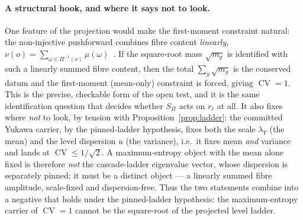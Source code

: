\documentclass[11pt]{article}
\theoremstyle{definition}
\theoremstyle{remark}
\newcommand{\CV}{\operatorname{CV}}
\newcommand{\rl}{r_{\ell}}
\newcommand{\SPi}{S_{\Pi}}
\begin{document}
    \paragraph{A structural hook, and where it says not to look.}
    One feature of the projection would make the first-moment constraint natural: the non-injective pushforward
    combines fibre content \emph{linearly}, $\nu(o) = \sum_{\omega \in \Pi^{-1}(o)} \mu(\omega)$~\cite{Beau2026l}.
    If the square-root mass $\sqrt{m_g}$ is identified with such a linearly summed fibre content, then the total
    $\sum_g \sqrt{m_g}$ is the conserved datum and the first-moment (mean-only) constraint is forced, giving
    $\CV = 1$.
    This is the precise, checkable form of the open test, and it is the same identification question that decides
    whether $\SPi$ acts on $\rl$ at all.
    It also fixes where \emph{not} to look, by tension with Proposition~\ref{prop:ladder}: the committed Yukawa
    carrier, by the pinned-ladder hypothesis, fixes both the scale $\lambda_Y$ (the mean) and the level dispersion $u$
    (the variance), i.e.\ it fixes mean \emph{and} variance and lands at $\CV \le 1/\sqrt2$.
    A maximum-entropy object with the mean alone fixed is therefore \emph{not} the cascade-ladder eigenvalue
    vector, whose dispersion is separately pinned; it must be a distinct object --- a linearly summed fibre
    amplitude, scale-fixed and dispersion-free.
    Thus the two statements combine into a negative that holds under the pinned-ladder hypothesis: the maximum-entropy carrier of $\CV = 1$
    cannot be the square-root of the projected level ladder.
\end{document}
